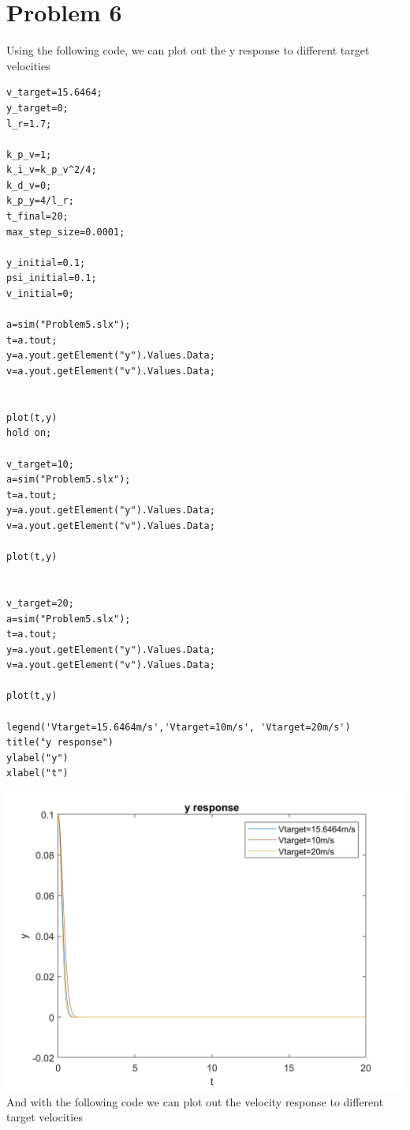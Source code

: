 \documentclass[12pt]{article}
\begin{document}
\section*{Problem 6}
Using the following code, we can plot out the y response to different target velocities
\begin{verbatim}
v_target=15.6464;
y_target=0;
l_r=1.7;

k_p_v=1;
k_i_v=k_p_v^2/4;
k_d_v=0;
k_p_y=4/l_r;
t_final=20;
max_step_size=0.0001;

y_initial=0.1;
psi_initial=0.1;
v_initial=0;

a=sim("Problem5.slx");
t=a.tout;
y=a.yout.getElement("y").Values.Data;
v=a.yout.getElement("v").Values.Data;


plot(t,y)
hold on;

v_target=10;
a=sim("Problem5.slx");
t=a.tout;
y=a.yout.getElement("y").Values.Data;
v=a.yout.getElement("v").Values.Data;
 
plot(t,y)


v_target=20;
a=sim("Problem5.slx");
t=a.tout;
y=a.yout.getElement("y").Values.Data;
v=a.yout.getElement("v").Values.Data;

plot(t,y)

legend('Vtarget=15.6464m/s','Vtarget=10m/s', 'Vtarget=20m/s')
title("y response")
ylabel("y")
xlabel("t")
\end{verbatim}
\includegraphics[scale=0.3]{Problem6y.jpg}\\
And with the following code we can plot out the velocity response to different target velocities
\end{document}

